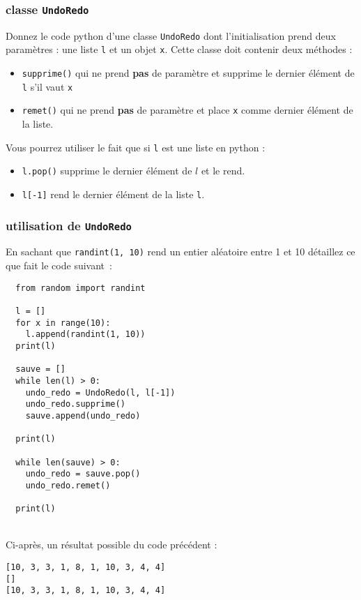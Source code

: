 \documentclass
[12pt]
{article}
\begin{document}
\subsubsection{classe {\tt UndoRedo}}
Donnez le code python d'une classe {\tt UndoRedo} dont l'initialisation prend deux paramètres : une liste {\tt l} et un objet {\tt x}. Cette classe doit contenir deux méthodes :
\begin{itemize}
  \item {\tt supprime()} qui ne prend {\bf pas} de paramètre et supprime le dernier élément de {\tt l} s'il vaut {\tt x}
  \item {\tt remet()} qui ne prend {\bf pas} de paramètre et place {\tt x} comme dernier élément de la liste.
\end{itemize}

Vous pourrez utiliser le fait que si {\tt l} est une liste en python :
\begin{itemize}
  \item {\tt l.pop()} supprime le dernier élément de $l$ et le rend.
  \item {\tt l[-1]} rend le dernier élément de la liste {\tt l}.
\end{itemize}


\subsubsection{utilisation de {\tt UndoRedo}}

En sachant que {\tt randint(1, 10)} rend un entier aléatoire entre 1 et 10 détaillez ce que fait le code suivant~:
\begin{verbatim}
  from random import randint

  l = [] 
  for x in range(10):
    l.append(randint(1, 10))
  print(l)

  sauve = []
  while len(l) > 0:
    undo_redo = UndoRedo(l, l[-1])
    undo_redo.supprime()
    sauve.append(undo_redo)
  
  print(l)
  
  while len(sauve) > 0:
    undo_redo = sauve.pop()
    undo_redo.remet()
  
  print(l)
\end{verbatim}

~\\
Ci-après, un résultat possible du code précédent : 
\begin{verbatim}
[10, 3, 3, 1, 8, 1, 10, 3, 4, 4]
[]
[10, 3, 3, 1, 8, 1, 10, 3, 4, 4]
\end{verbatim}
\end{document}
